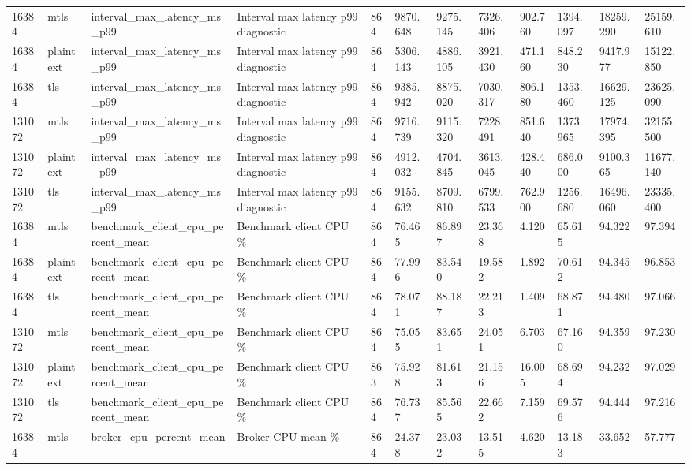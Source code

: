 \begin{longtable}{llllllllllll}
16384 & mtls & interval\_max\_latency\_ms\_p99 & Interval max latency p99 diagnostic & 864 & 9870.648 & 9275.145 & 7326.406 & 902.760 & 1394.097 & 18259.290 & 25159.610 \\
16384 & plaintext & interval\_max\_latency\_ms\_p99 & Interval max latency p99 diagnostic & 864 & 5306.143 & 4886.105 & 3921.430 & 471.160 & 848.230 & 9417.977 & 15122.850 \\
16384 & tls & interval\_max\_latency\_ms\_p99 & Interval max latency p99 diagnostic & 864 & 9385.942 & 8875.020 & 7030.317 & 806.180 & 1353.460 & 16629.125 & 23625.090 \\
131072 & mtls & interval\_max\_latency\_ms\_p99 & Interval max latency p99 diagnostic & 864 & 9716.739 & 9115.320 & 7228.491 & 851.640 & 1373.965 & 17974.395 & 32155.500 \\
131072 & plaintext & interval\_max\_latency\_ms\_p99 & Interval max latency p99 diagnostic & 864 & 4912.032 & 4704.845 & 3613.045 & 428.440 & 686.000 & 9100.365 & 11677.140 \\
131072 & tls & interval\_max\_latency\_ms\_p99 & Interval max latency p99 diagnostic & 864 & 9155.632 & 8709.810 & 6799.533 & 762.900 & 1256.680 & 16496.060 & 23335.400 \\
16384 & mtls & benchmark\_client\_cpu\_percent\_mean & Benchmark client CPU \% & 864 & 76.465 & 86.897 & 23.368 & 4.120 & 65.615 & 94.322 & 97.394 \\
16384 & plaintext & benchmark\_client\_cpu\_percent\_mean & Benchmark client CPU \% & 864 & 77.996 & 83.540 & 19.582 & 1.892 & 70.612 & 94.345 & 96.853 \\
16384 & tls & benchmark\_client\_cpu\_percent\_mean & Benchmark client CPU \% & 864 & 78.071 & 88.187 & 22.213 & 1.409 & 68.871 & 94.480 & 97.066 \\
131072 & mtls & benchmark\_client\_cpu\_percent\_mean & Benchmark client CPU \% & 864 & 75.055 & 83.651 & 24.051 & 6.703 & 67.160 & 94.359 & 97.230 \\
131072 & plaintext & benchmark\_client\_cpu\_percent\_mean & Benchmark client CPU \% & 863 & 75.928 & 81.613 & 21.156 & 16.005 & 68.694 & 94.232 & 97.029 \\
131072 & tls & benchmark\_client\_cpu\_percent\_mean & Benchmark client CPU \% & 864 & 76.737 & 85.565 & 22.662 & 7.159 & 69.576 & 94.444 & 97.216 \\
16384 & mtls & broker\_cpu\_percent\_mean & Broker CPU mean \% & 864 & 24.378 & 23.032 & 13.515 & 4.620 & 13.183 & 33.652 & 57.777 \\

\end{longtable}
